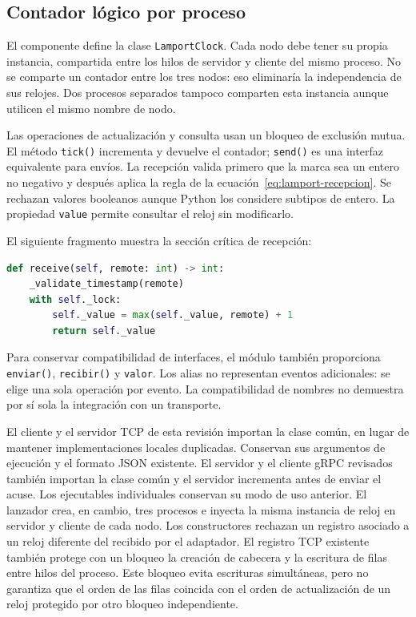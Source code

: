 \subsection{Contador lógico por proceso}
El componente  define la clase
\texttt{LamportClock}. Cada nodo debe tener su propia instancia, compartida
entre los hilos de servidor y cliente del mismo proceso. No se comparte un
contador entre los tres nodos: eso eliminaría la independencia de sus relojes.
Dos procesos separados tampoco comparten esta instancia aunque utilicen el
mismo nombre de nodo.

Las operaciones de actualización y consulta usan un bloqueo de exclusión mutua.
El método \texttt{tick()} incrementa y devuelve el contador; \texttt{send()}
es una interfaz equivalente para envíos. La recepción valida primero que la
marca sea un entero no negativo y después aplica la regla de
la ecuación~\eqref{eq:lamport-recepcion}. Se rechazan valores booleanos aunque
Python los considere subtipos de entero. La propiedad \texttt{value} permite
consultar el reloj sin modificarlo.

El siguiente fragmento muestra la sección crítica de recepción:
\begin{lstlisting}[language=Python]
def receive(self, remote: int) -> int:
    _validate_timestamp(remote)
    with self._lock:
        self._value = max(self._value, remote) + 1
        return self._value
\end{lstlisting}

Para conservar compatibilidad de interfaces, el módulo también proporciona
\texttt{enviar()}, \texttt{recibir()} y \texttt{valor}. Los alias no representan
eventos adicionales: se elige una sola operación por evento. La compatibilidad
de nombres no demuestra por sí sola la integración con un transporte.

El cliente y el servidor TCP de esta revisión importan la clase común, en lugar
de mantener implementaciones locales duplicadas. Conservan sus argumentos de
ejecución y el formato JSON existente. El servidor y el cliente gRPC revisados
también importan la clase común y el servidor incrementa antes de enviar el acuse.
Los ejecutables individuales conservan su modo de uso anterior. El lanzador
 crea, en cambio, tres procesos e inyecta
la misma instancia de reloj en servidor y cliente de cada nodo. Los constructores
rechazan un registro asociado a un reloj diferente del recibido por el adaptador.
El registro TCP existente también protege con un bloqueo la creación de cabecera
y la escritura de filas entre hilos del proceso. Este bloqueo evita escrituras
simultáneas, pero no garantiza que el orden de las filas coincida con el orden
de actualización de un reloj protegido por otro bloqueo independiente.

